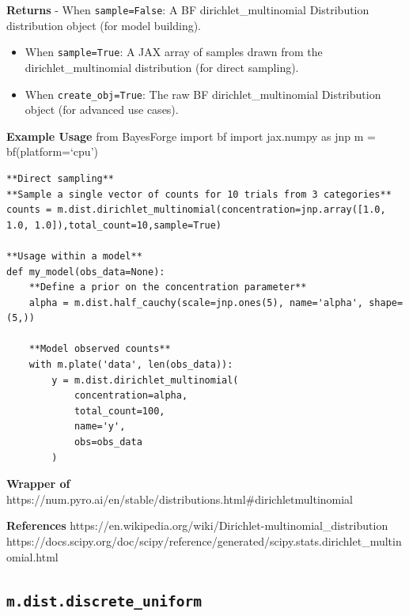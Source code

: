 \documentclass[
  letterpaper,
  DIV=11,
  numbers=noendperiod]{scrartcl}
\begin{document}
\textbf{Returns} - When \texttt{sample=False}: A BF
dirichlet\_multinomial Distribution distribution object (for model
building).

\begin{itemize}
\item
  When \texttt{sample=True}: A JAX array of samples drawn from the
  dirichlet\_multinomial distribution (for direct sampling).
\item
  When \texttt{create\_obj=True}: The raw BF dirichlet\_multinomial
  Distribution object (for advanced use cases).
\end{itemize}

\textbf{Example Usage} from BayesForge import bf import jax.numpy as jnp
m = bf(platform=`cpu')

\begin{verbatim}
**Direct sampling**
**Sample a single vector of counts for 10 trials from 3 categories**
counts = m.dist.dirichlet_multinomial(concentration=jnp.array([1.0, 1.0, 1.0]),total_count=10,sample=True)

**Usage within a model**
def my_model(obs_data=None):
    **Define a prior on the concentration parameter**
    alpha = m.dist.half_cauchy(scale=jnp.ones(5), name='alpha', shape=(5,))

    **Model observed counts**
    with m.plate('data', len(obs_data)):
        y = m.dist.dirichlet_multinomial(
            concentration=alpha,
            total_count=100,
            name='y',
            obs=obs_data
        )
\end{verbatim}

\textbf{Wrapper of}
https://num.pyro.ai/en/stable/distributions.html\#dirichletmultinomial

\textbf{References}
https://en.wikipedia.org/wiki/Dirichlet-multinomial\_distribution
https://docs.scipy.org/doc/scipy/reference/generated/scipy.stats.dirichlet\_multinomial.html

\subsection{\texorpdfstring{\texttt{m.dist.discrete\_uniform}}{m.dist.discrete\_uniform}}\label{discrete_uniform}
\end{document}
